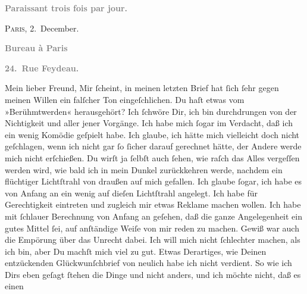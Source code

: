 \begin{ledgroupsized}[t]{13cm}
           \pstart
           \begin{otherlanguage}{french}\textcolor{gray}{\textbf{\textbf{Paraissant trois fois par jour.}}}\end{otherlanguage}\hfill \textsc{Paris}, 2. December.\pend
           \pstart
           \begin{otherlanguage}{french}\textcolor{gray}{\textbf{\textbf{Bureau à Paris}}}\end{otherlanguage}\pend
           \pstart
           \begin{otherlanguage}{french}\textcolor{gray}{\textbf{\textbf{24. Rue Feydeau.}}}\end{otherlanguage}\pend
           \pstart\center{}Mein lieber Freund,\pend\pstart
           Mir ſcheint, in meinen letzten Brief hat ſich ſehr gegen meinen Willen ein falſcher
               Ton eingeſchlichen. Du haſt etwas vom »Berühmtwerden« herausgehört? Ich ſchwöre Dir,
               ich bin durchdrungen von der Nichtigkeit und \label{K_L02794-1v}\label{K_L02794-1h} aller jener Vorgänge. Ich habe mich ſogar im Verdacht,
               daß ich ein  wenig Komödie geſpielt habe. Ich \strikeout{\textcolor{gray}{×}} glaube, ich hätte mich vielleicht doch nicht geſchlagen, wenn ich nicht gar ſo
               ſicher darauf gerechnet hätte, der Andere werde mich nicht erſchießen. Du wirſt ja
               ſelbſt auch ſehen, wie raſch das Alles vergeſſen werden {\pb}wird, wie bald ich in mein Dunkel zurückkehren
               werde, nachdem ein flüchtiger Lichtſtrahl von draußen auf mich gefallen. Ich glaube
               ſogar, ich habe es von Anfang an ein wenig auf dieſen Lichtſtrahl angelegt. Ich habe
               für Gerechtigkeit eintreten und zugleich mir etwas  Reklame machen wollen. Ich habe mit ſchlauer Berechnung von Anfang an
               geſehen, daß die ganze Angelegenheit ein gutes Mittel ſei, auf anſtändige Weiſe von
               mir reden zu machen. Gewiß war auch die Empörung über das Unrecht dabei. Ich will
               mich nicht ſchlechter machen, als ich bin, aber Du machſt {\pb}mich viel zu gut. Etwas Derartiges, wie Deinen
               entzückenden Glückwunſchbrief von neulich habe ich nicht verdient. So wie ich Dirs
               eben geſagt ſtehen die Dinge und nicht anders, und ich möchte nicht, daß es einen

\end{ledgroupsized}
